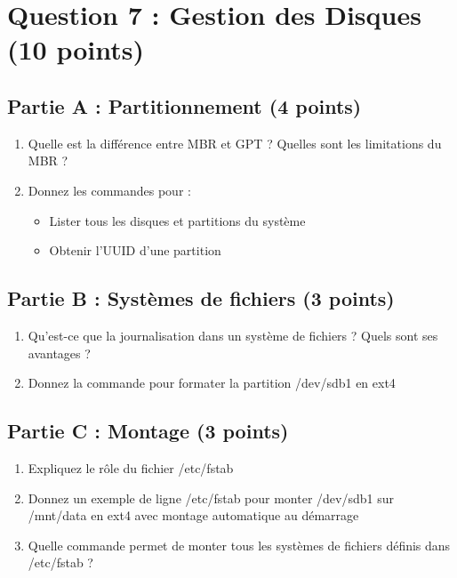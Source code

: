 \documentclass[12pt,a4paper]{article}
\begin{document}
\newpage


\section{Question 7 : Gestion des Disques (10 points)}

\begin{questionbox}
\subsection*{Partie A : Partitionnement (4 points)}
\begin{enumerate}[label=\alph*)]
    \item Quelle est la différence entre MBR et GPT ? Quelles sont les limitations du MBR ?
    \item Donnez les commandes pour :
    \begin{itemize}
        \item Lister tous les disques et partitions du système
        \item Obtenir l'UUID d'une partition
    \end{itemize}
\end{enumerate}

\subsection*{Partie B : Systèmes de fichiers (3 points)}
\begin{enumerate}[label=\alph*)]
    \item Qu'est-ce que la journalisation dans un système de fichiers ? Quels sont ses avantages ?
    \item Donnez la commande pour formater la partition /dev/sdb1 en ext4
\end{enumerate}

\subsection*{Partie C : Montage (3 points)}
\begin{enumerate}[label=\alph*)]
    \item Expliquez le rôle du fichier /etc/fstab
    \item Donnez un exemple de ligne /etc/fstab pour monter /dev/sdb1 sur /mnt/data en ext4 avec montage automatique au démarrage
    \item Quelle commande permet de monter tous les systèmes de fichiers définis dans /etc/fstab ?
\end{enumerate}
\end{questionbox}
\end{document}
